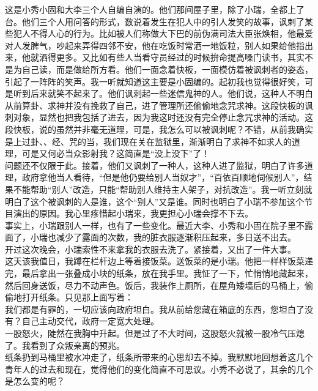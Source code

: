 这是小秀小固和大李三个人自编自演的。他们那间屋子里，除了小瑞，全都上了台。他们三个人用问答的形式，数说着发生在犯人中的引人发笑的故事，讽刺了某些犯人不得人心的行为。比如被人们称做大下巴的前伪满司法大臣张焕相，他最爱对人发脾气，吵起来弄得四邻不安，他在吃饭时常洒一地饭粒，别人如果给他指出来，他就洒得更多。又比如有些人当看守员经过的时候拚命提高嗓门读书，其实不是为自己读，而是做给所方看。他们一面念着快板，一面模仿着被讽刺者的姿态，引起了一阵阵的笑声。我一听就知道这主要是小固编的。起初我也觉得很好笑，可是听到后来就笑不起来了。他们讽刺起一些迷信鬼神的人。他们说，这种人不明白从前算卦、求神并没有挽救了自己，进了管理所还偷偷地念咒求神。这段快板的讽刺对象，显然也把我包括了进去，因为我这时还没有完全停止念咒求神的活动。这段快板，说的虽然并非毫无道理，可是，我怎么可以被讽刺呢？不错，从前我确实是上过卦、、经、咒的当，我们现在关在监狱里，渐渐明白了求神不如求人的道理，可是又何必当众影射我？这简直是“没上没下”了！\\

问题还不仅限于此。接着，他们又讽刺了一种人，这种人进了监狱，明白了许多道理，政府拿他当人看待，“但是他仍要给别人当奴才”，“百依百顺地伺候别人”，结果不能帮助“别人”改造，只能“帮助别人维持主人架子，对抗改造”。我一听立刻就明白了这个被讽刺的人是谁，这个“别人”又是谁。同时也明白了小瑞不参加这个节目演出的原因。我心里疼惜起小瑞来，我更担心小瑞会撑不下去。\\

事实上，小瑞跟别人一样，也有了一些变化。最近大李、小秀和小固在院子里不露面了，小瑞也减少了露面的次数，我的脏衣服逐渐积压起来，多日送不出去。\\

开过这次晚会，小瑞索性不来拿我的衣服去洗了。紧接着，又出了一件大事。\\

这天该我值日，我蹲在栏杆边上等着接饭菜。送饭菜的是小瑞。他把一样样饭菜递完，最后拿出一张叠成小块的纸条，放在我手里。我怔了一下，忙悄悄地藏起来，然后回身送饭，尽力不动声色。饭后，我装作上厕所，在屋角矮墙后的马桶上，偷偷地打开纸条。只见那上面写着：\\

我们都是有罪的，一切应该向政府坦白。我从前给您藏在箱底的东西，您坦白了没有？自己主动交代，政府一定宽大处理。\\

一股怒火，陡然在我胸中升起。但是过了不大时间，这股怒火就被一股冷气压熄了。我看到了众叛亲离的预兆。\\

纸条扔到马桶里被水冲走了，纸条所带来的心思却去不掉。我默默地回想着这几个青年人的过去和现在，觉得他们的变化简直不可思议。小秀不必说了，其余的几个是怎么变的呢？\\

